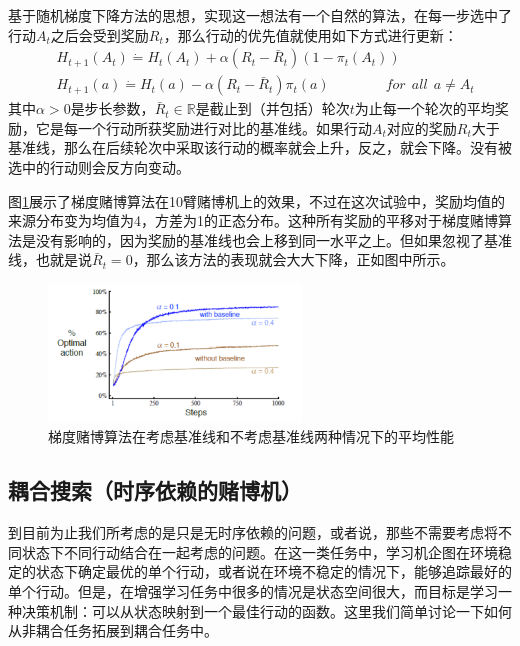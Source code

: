 \documentclass{ctexart}
\begin{document}
            基于随机梯度下降方法的思想，实现这一想法有一个自然的算法，在每一步选中了行动$A_t$之后会受到奖励$R_t$，那么行动的优先值就使用如下方式进行更新：
            \begin{equation}
                \begin{split}
                    &H_{t+1}(A_t) \dot{=} H_t(A_t) + \alpha(R_t-\bar{R}_t)(1-\pi_t(A_t)) \\
                    &H_{t+1}(a) \dot{=} H_t(a) - \alpha (R_t - \bar{R}_t)\pi_t(a) \qquad \qquad for\ \ all \ \  a\ne A_t
                \end{split}
            \end{equation}
            其中$\alpha > 0$是步长参数，$\bar{R}_t\in \mathbb{R}$是截止到（并包括）轮次$t$为止每一个轮次的平均奖励，它是每一个行动所获奖励进行对比的基准线。如果行动$A_t$对应的奖励$R_t$大于基准线，那么在后续轮次中采取该行动的概率就会上升，反之，就会下降。没有被选中的行动则会反方向变动。

            图\ref{f2_5}展示了梯度赌博算法在10臂赌博机上的效果，不过在这次试验中，奖励均值的来源分布变为均值为4，方差为1的正态分布。这种所有奖励的平移对于梯度赌博算法是没有影响的，因为奖励的基准线也会上移到同一水平之上。但如果忽视了基准线，也就是说$\bar{R}_t=0$，那么该方法的表现就会大大下降，正如图中所示。
            \begin{figure}
                \centering
                \includegraphics[width=0.6\textwidth]{f2-5}
                \caption{梯度赌博算法在考虑基准线和不考虑基准线两种情况下的平均性能}
                \label{f2_5}
            \end{figure}

        \subsection{耦合搜索（时序依赖的赌博机）}
            到目前为止我们所考虑的是只是无时序依赖的问题，或者说，那些不需要考虑将不同状态下不同行动结合在一起考虑的问题。在这一类任务中，学习机企图在环境稳定的状态下确定最优的单个行动，或者说在环境不稳定的情况下，能够追踪最好的单个行动。但是，在增强学习任务中很多的情况是状态空间很大，而目标是学习一种决策机制：可以从状态映射到一个最佳行动的函数。这里我们简单讨论一下如何从非耦合任务拓展到耦合任务中。
\end{document}
